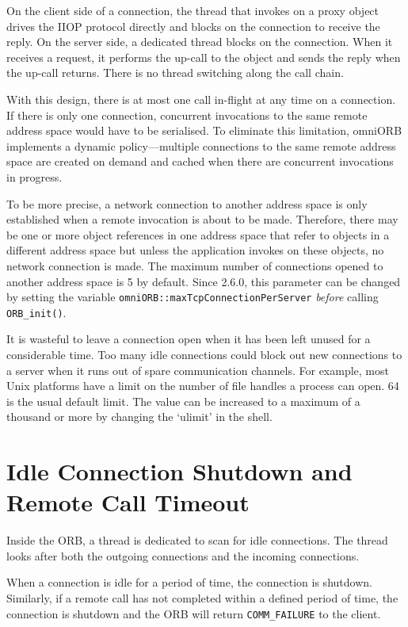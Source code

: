 \documentclass[11pt,twoside,a4paper]{book}
\newcommand{\code}[1]{\texttt{#1}}
\newcommand{\op}[1]{\texttt{#1()}}
\begin{document}
On the client side of a connection, the thread that invokes on a proxy
object drives the IIOP protocol directly and blocks on the connection
to receive the reply. On the server side, a dedicated thread blocks on
the connection. When it receives a request, it performs the up-call to
the object and sends the reply when the up-call returns. There is no
thread switching along the call chain.

With this design, there is at most one call in-flight at any time on a
connection. If there is only one connection, concurrent invocations to
the same remote address space would have to be serialised. To
eliminate this limitation, omniORB implements a dynamic
policy---multiple connections to the same remote address space are
created on demand and cached when there are concurrent invocations in
progress.

To be more precise, a network connection to another address space is
only established when a remote invocation is about to be made.
Therefore, there may be one or more object references in one address
space that refer to objects in a different address space but unless
the application invokes on these objects, no network connection is
made. The maximum number of connections opened to another address
space is 5 by default. Since 2.6.0, this parameter can be changed by
setting the variable \code{omniORB::maxTcpConnectionPerServer}
\emph{before} calling \op{ORB\_init}.

It is wasteful to leave a connection open when it has been left unused
for a considerable time. Too many idle connections could block out new
connections to a server when it runs out of spare communication
channels. For example, most Unix platforms have a limit on the number
of file handles a process can open. 64 is the usual default limit. The
value can be increased to a maximum of a thousand or more by changing
the `ulimit' in the shell.

\section{Idle Connection Shutdown and Remote Call Timeout}
\label{sec_shut}

Inside the ORB, a thread is dedicated to scan for idle connections.
The thread looks after both the outgoing connections and the incoming
connections.

When a connection is idle for a period of time, the connection is
shutdown. Similarly, if a remote call has not completed within a
defined period of time, the connection is shutdown and the ORB will
return \code{COMM\_FAILURE} to the client.
\end{document}
